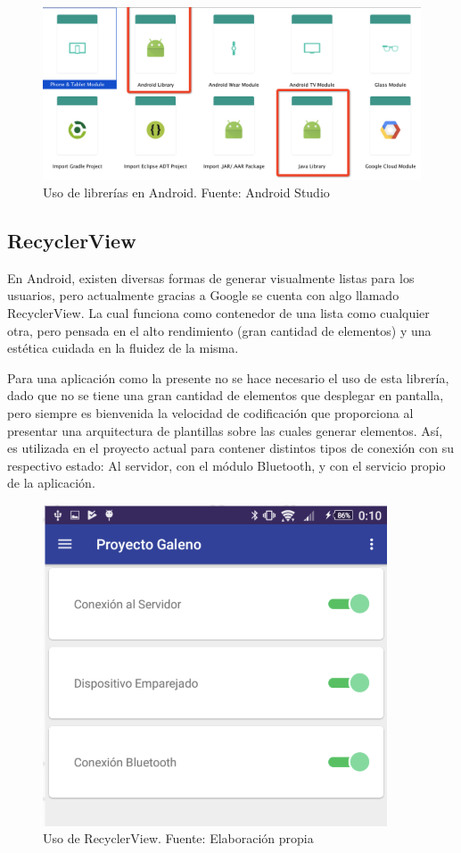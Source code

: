 \begin{figure}[H]
	\centering
	\includegraphics[scale=0.3]{figuras/proto1/library.png}
	\caption{Uso de librerías en Android. Fuente: Android Studio}
	\label{library}
\end{figure}

 \newpage

\subsection{RecyclerView}

En Android, existen diversas formas de generar visualmente listas para los usuarios, pero actualmente gracias a Google se cuenta con algo llamado RecyclerView. La cual funciona como contenedor de una lista como cualquier otra, pero pensada en el alto rendimiento (gran cantidad de elementos) y una estética cuidada en la fluidez de la misma. 

Para una aplicación como la presente no se hace necesario el uso de esta librería, dado que no se tiene una gran cantidad de elementos que desplegar en pantalla, pero siempre es bienvenida la velocidad de codificación que proporciona al presentar una arquitectura de plantillas sobre las cuales generar elementos. Así, es utilizada en el proyecto actual para contener distintos tipos de conexión  con su respectivo estado: Al servidor, con el módulo Bluetooth, y con el servicio propio de la aplicación.\newline

\begin{figure}[H]
	\centering
	\includegraphics[scale=1]{figuras/proto1/recycler.png}
	\caption{Uso de RecyclerView. Fuente: Elaboración propia}
	\label{recycler}
\end{figure} 

